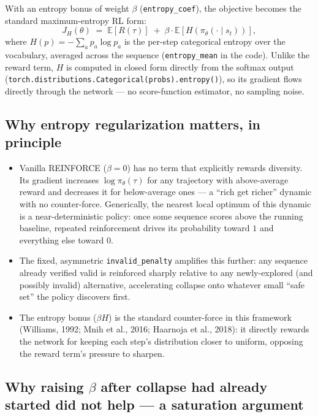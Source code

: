 \documentclass[11pt]{article}
\newcommand{\code}[1]{\texttt{#1}}
\begin{document}
With an entropy bonus of weight $\beta$ (\code{entropy\_coef}), the objective becomes the standard maximum-entropy RL form:
\[
  J_H(\theta) \;=\; \mathbb{E}[R(\tau)] \;+\; \beta \cdot \mathbb{E}\!\left[ H\!\left(\pi_\theta(\cdot \mid s_t)\right) \right],
\]
where $H(p) = -\sum_a p_a \log p_a$ is the per-step categorical entropy over the vocabulary, averaged across the sequence (\code{entropy\_mean} in the code). Unlike the reward term, $H$ is computed in closed form directly from the softmax output (\code{torch.distributions.Categorical(probs).entropy()}), so its gradient flows directly through the network --- no score-function estimator, no sampling noise.

\subsection{Why entropy regularization matters, in principle}

\begin{itemize}
  \item Vanilla REINFORCE ($\beta=0$) has no term that explicitly rewards diversity. Its gradient increases $\log \pi_\theta(\tau)$ for any trajectory with above-average reward and decreases it for below-average ones --- a ``rich get richer'' dynamic with no counter-force. Generically, the nearest local optimum of this dynamic is a near-deterministic policy: once some sequence scores above the running baseline, repeated reinforcement drives its probability toward $1$ and everything else toward $0$.
  \item The fixed, asymmetric \code{invalid\_penalty} amplifies this further: any sequence already verified valid is reinforced sharply relative to any newly-explored (and possibly invalid) alternative, accelerating collapse onto whatever small ``safe set'' the policy discovers first.
  \item The entropy bonus ($\beta H$) is the standard counter-force in this framework (Williams, 1992; Mnih et al., 2016; Haarnoja et al., 2018): it directly rewards the network for keeping each step's distribution closer to uniform, opposing the reward term's pressure to sharpen.
\end{itemize}

\subsection{Why raising $\beta$ after collapse had already started did not help --- a saturation argument}
\label{sec:8.4}
\end{document}

